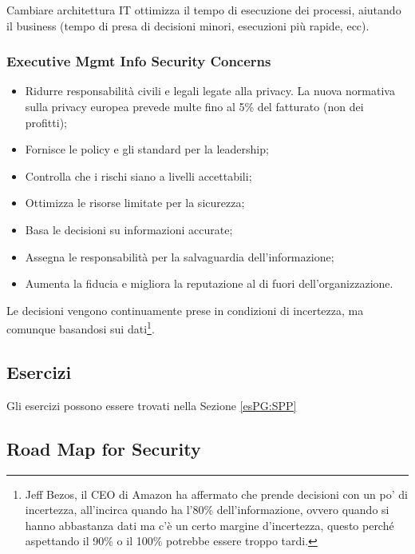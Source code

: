 Cambiare architettura IT ottimizza il tempo di esecuzione dei processi, aiutando
il business (tempo di presa di decisioni minori, esecuzioni più rapide, ecc).

\subsubsection{Executive Mgmt Info Security Concerns}

\begin{itemize}
\item Ridurre responsabilità civili e legali legate alla privacy. La nuova
normativa sulla privacy europea prevede multe fino al 5\% del fatturato (non dei
profitti);
\item Fornisce le policy e gli standard per la leadership;
\item Controlla che i rischi siano a livelli accettabili;
\item Ottimizza le risorse limitate per la sicurezza;
\item Basa le decisioni su informazioni accurate;
\item Assegna le responsabilità per la salvaguardia dell'informazione;
\item Aumenta la fiducia e migliora la reputazione al di fuori
dell'organizzazione.
\end{itemize}


Le decisioni vengono continuamente prese in condizioni di incertezza, ma
comunque basandosi sui dati\footnote{Jeff Bezos, il CEO di Amazon ha
affermato che prende decisioni con un po' di incertezza, all'incirca
quando ha l'80\% dell'informazione, ovvero quando si hanno abbastanza
dati ma c'è un certo margine d'incertezza, questo perché aspettando il
90\% o il 100\% potrebbe essere troppo tardi.}.


\subsection{Esercizi}

Gli esercizi possono essere trovati nella Sezione \ref{esPG:SPP}
\newpage
\subsection{Road Map for Security}

